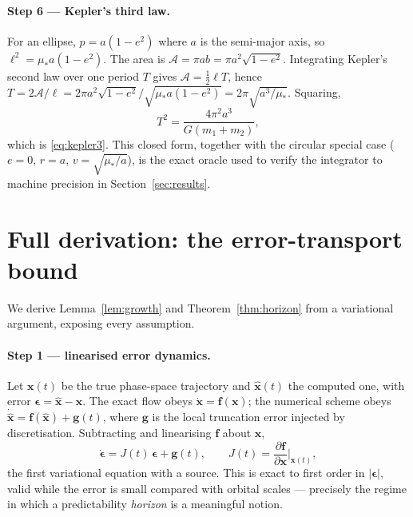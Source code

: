 \documentclass[11pt]{article}
\theoremstyle{definition}
\begin{document}
\paragraph{Step 6 --- Kepler's third law.}
For an ellipse, $p = a(1-e^2)$ where $a$ is the semi-major axis, so
$\ell^2 = \mu_{\!*}a(1-e^2)$. The area is $\mathcal A = \pi a b = \pi a^2\sqrt{1-e^2}$.
Integrating Kepler's second law over one period $T$ gives
$\mathcal A = \tfrac12\ell T$, hence $T = 2\mathcal A/\ell =
2\pi a^2\sqrt{1-e^2}/\sqrt{\mu_{\!*}a(1-e^2)} = 2\pi\sqrt{a^3/\mu_{\!*}}$. Squaring,
\begin{equation}
T^2 = \frac{4\pi^2 a^3}{G(m_1+m_2)},
\end{equation}
which is \eqref{eq:kepler3}. This closed form, together with the circular
special case ($e=0$, $r=a$, $v=\sqrt{\mu_{\!*}/a}$), is the exact oracle used to
verify the integrator to machine precision in Section~\ref{sec:results}.

\section{Full derivation: the error-transport bound}
\label{app:transport}

We derive Lemma~\ref{lem:growth} and Theorem~\ref{thm:horizon} from a
variational argument, exposing every assumption.

\paragraph{Step 1 --- linearised error dynamics.}
Let $\mathbf x(t)$ be the true phase-space trajectory and $\hat{\mathbf x}(t)$
the computed one, with error $\boldsymbol\epsilon = \hat{\mathbf x} - \mathbf x$.
The exact flow obeys $\dot{\mathbf x} = \mathbf f(\mathbf x)$; the numerical
scheme obeys $\dot{\hat{\mathbf x}} = \mathbf f(\hat{\mathbf x}) +
\mathbf g(t)$, where $\mathbf g$ is the local truncation error injected by
discretisation. Subtracting and linearising $\mathbf f$ about $\mathbf x$,
\begin{equation}
\dot{\boldsymbol\epsilon} = J(t)\,\boldsymbol\epsilon + \mathbf g(t),
\qquad J(t) = \frac{\partial \mathbf f}{\partial \mathbf x}\Big|_{\mathbf x(t)},
\label{eq:variational}
\end{equation}
the first variational equation with a source. This is exact to first order in
$|\boldsymbol\epsilon|$, valid while the error is small compared with orbital
scales --- precisely the regime in which a predictability \emph{horizon} is a
meaningful notion.
\end{document}
